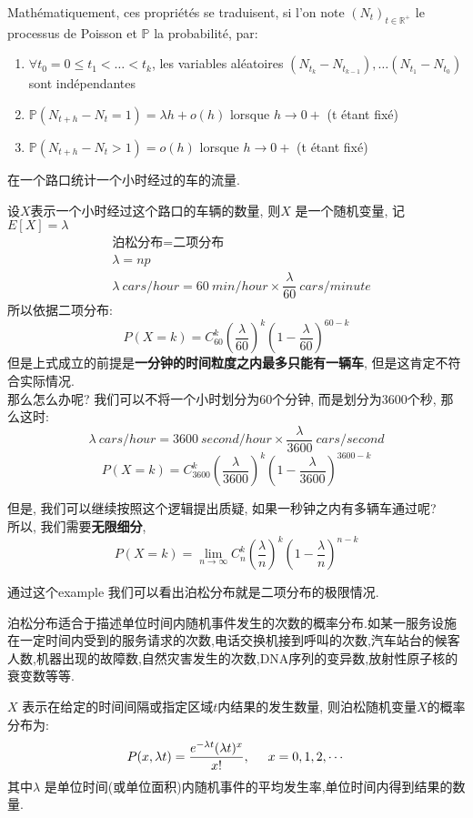\documentclass{article}
\begin{document}
Math\'ematiquement, ces propri\'et\'es se traduisent, si l'on note $(N_{t})_{{t\in {\mathbb  {R}}^{+}}}$ le processus de Poisson et ${\mathbb  {P}}$ la probabilit\'e, par:
\begin{enumerate}
\item $\forall t_{0}=0\leq t_{1}<\dots <t_{k}$, les variables al\'eatoires $(N_{{t_{k}}}-N_{{t_{{k-1}}}}),\dots (N_{{t_{1}}}-N_{{t_{0}}})$ sont ind\'ependantes
\item ${\mathbb{P}}(N_{{t+h}}-N_{t}=1)=\lambda h+o(h)$ lorsque $h\to 0+$ (t \'etant fix\'e)
\item ${\mathbb{P}}(N_{{t+h}}-N_{t}>1)=o(h)$ lorsque $h\to 0+$ (t \'etant fix\'e)
\end{enumerate}

\begin{example}
在一个路口统计一个小时经过的车的流量.

设$X$表示一个小时经过这个路口的车辆的数量, 则$X$ 是一个随机变量, 记$E[X] = \lambda$
$$
\begin{aligned}
		&\text{泊松分布}  =  \text{二项分布}\\
		&\lambda  =  np \\
		&\lambda \ cars/hour   =  60\ min/hour \times \dfrac{\lambda}{60}\ cars/minute
\end{aligned}
$$
所以依据二项分布:
$$P(X=k) = C_{60}^k (\dfrac{\lambda}{60})^k (1 - \dfrac{\lambda}{60})^{60 - k}$$
但是上式成立的前提是\textbf{一分钟的时间粒度之内最多只能有一辆车}, 但是这肯定不符合实际情况.\\
那么怎么办呢? 我们可以不将一个小时划分为60个分钟, 而是划分为3600个秒, 那么这时:
$$\lambda\ cars/hour = 3600\ second/hour \times \dfrac{\lambda}{3600}\ cars/second$$
$$P(X=k) = C_{3600}^k (\dfrac{\lambda}{3600})^k (1 - \dfrac{\lambda}{3600})^{3600 - k}$$

但是, 我们可以继续按照这个逻辑提出质疑, 如果一秒钟之内有多辆车通过呢?\\
所以, 我们需要\textbf{无限细分},
$$P(X=k) = \lim_{n \to \infty}C_{n}^k (\dfrac{\lambda}{n})^k (1 - \dfrac{\lambda}{n})^{n - k}$$

通过这个example 我们可以看出泊松分布就是二项分布的极限情况.
\end{example}

泊松分布适合于描述单位时间内随机事件发生的次数的概率分布.如某一服务设施在一定时间内受到的服务请求的次数,电话交换机接到呼叫的次数,汽车站台的候客人数,机器出现的故障数,自然灾害发生的次数,DNA序列的变异数,放射性原子核的衰变数等等.

\bigskip
$X$ 表示在给定的时间间隔或指定区域$t$内结果的发生数量, 则泊松随机变量$X$的概率分布为:
$$
P(x,\lambda t)={\frac  {e^{-\lambda t}(\lambda t) ^{x}}{x!}}, \hspace{0.5cm} x=0,1,2,\cdots
$$
其中$\lambda$ 是单位时间(或单位面积)内随机事件的平均发生率,单位时间内得到结果的数量.
\end{document}
